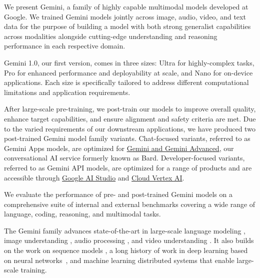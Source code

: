 We present Gemini, a family of highly capable multimodal models developed at Google. We trained Gemini models jointly across image, audio, video, and text data for the purpose of building a model with both strong generalist capabilities across modalities alongside cutting-edge understanding and reasoning performance in each respective domain. 

Gemini 1.0, our first version, comes in three sizes: Ultra for highly-complex tasks, Pro for enhanced performance and deployability at scale, and Nano for on-device applications. Each size is specifically tailored to address different computational limitations and application requirements. 

After large-scale pre-training, we post-train our models to improve overall quality, enhance target capabilities, and ensure alignment and safety criteria are met. Due to the varied requirements of our downstream applications, we have produced two post-trained Gemini model family variants. Chat-focused variants, referred to as Gemini Apps models, are optimized for \href{https://gemini.google.com}{Gemini and Gemini Advanced}, our conversational AI service formerly known as Bard. Developer-focused variants, referred to as Gemini API models, are optimized for a range of products and are accessible through \href{https://makersuite.google.com}{Google AI Studio} and \href{https://cloud.google.com/vertex-ai}{Cloud Vertex AI}.

We evaluate the performance of pre- and post-trained Gemini models on a comprehensive suite of internal and external benchmarks covering a wide range of language, coding, reasoning, and multimodal tasks.

The Gemini family advances state-of-the-art in large-scale language modeling \citep{gpt2, gpt3, gopher, palm, chinchilla, palm2, gpt4}, image understanding \citep{vit, pali, coca, flamingo, gato, gpt4v}, audio processing \citep{whisper, usm}, and video understanding \citep{flamingo, palix}. It also builds on the work on sequence models \cite{sutskever2014sequence}, a long history of work in deep learning based on neural networks~\citep{lecun2015deep}, and machine learning distributed systems \cite{distbelief,jax,pathways} that enable large-scale training. 


